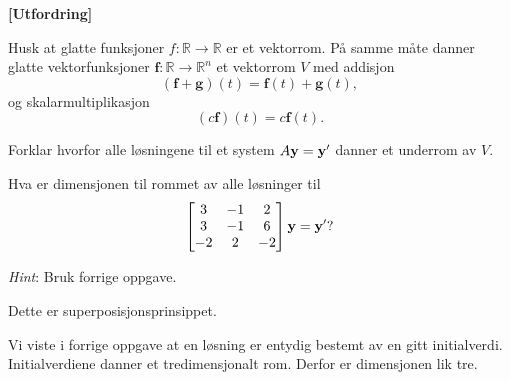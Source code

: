 \begin{oppgave}\textbf{[Utfordring]}
	
\noindent
Husk at glatte funksjoner $f :\mathbb{R}\rightarrow \mathbb{R}$ er et vektorrom. På samme måte danner glatte vektorfunksjoner $\mathbf f:\mathbb{R}\rightarrow \mathbb{R}^n$ et vektorrom $V$ med addisjon
$$(\mathbf f + \mathbf g)(t)=\mathbf{f}(t)+\mathbf{g}(t),$$ og skalarmultiplikasjon
$$(c \mathbf f )(t)=c\mathbf{f}(t).$$

\begin{punkt}
Forklar hvorfor alle løsningene til et system $A\mathbf{y}=\mathbf{y}'$ danner et underrom av $V$.
\end{punkt}

\begin{punkt}
Hva er dimensjonen til rommet av alle løsninger til $$
\begin{bmatrix}
3 & -1 & 2\\
3 & -1 & 6\\
-2 & 2 & -2
\end{bmatrix} \mathbf{y}= \mathbf{y} ' ?$$

\noindent
\emph{Hint}: Bruk forrige oppgave.
\end{punkt}


\end{oppgave}





\begin{losning}
	\begin{punkt}
		Dette er superposisjonsprinsippet.
	\end{punkt}
	
	\begin{punkt}
	Vi viste i forrige oppgave at en løsning er entydig bestemt av en gitt initialverdi. Initialverdiene danner et tredimensjonalt rom. Derfor er dimensjonen lik tre.
	\end{punkt}
	
	
\end{losning}
